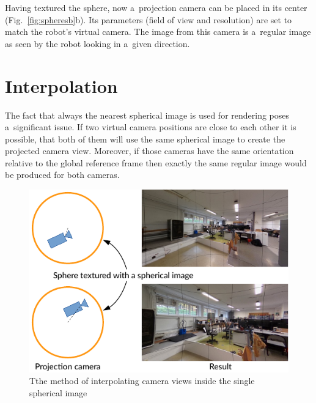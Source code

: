 \documentclass[conference]{ieeetran}
\begin{document}
Having textured the sphere, now a~projection camera can be placed in its center (Fig.~\ref{fig:spheresb}b).
Its parameters (field of view and resolution) are set to match the robot's virtual camera.
The image from this camera is a~regular image as seen by the robot looking in a~given direction.

\section{Interpolation}
\label{sec:iterpolate}


The fact that always the nearest spherical image is used for rendering poses a~significant issue.
If two virtual camera positions are close to each other it is possible, that both of them will use
the same spherical image to create the projected camera view.
Moreover, if those cameras have the same orientation relative to the global reference frame then
exactly the same regular image would be produced for both cameras.

\begin{figure}[!ht]
    \centering
    \includegraphics{img/interpolation/proj.pdf}
    \caption{Tthe method of interpolating camera views inside the single spherical image}
    \label{fig:interpolation}
\end{figure}
\end{document}
